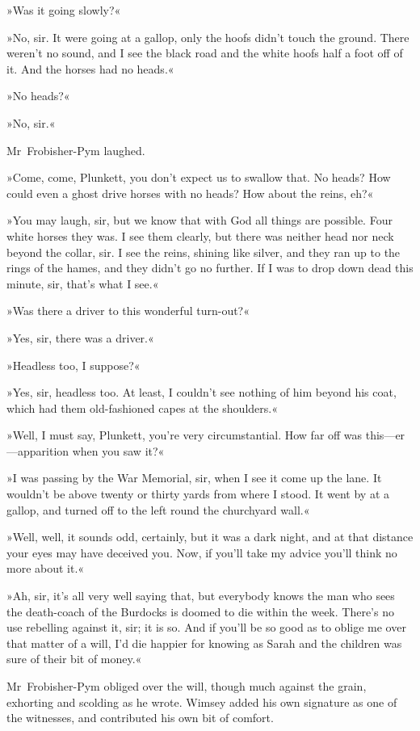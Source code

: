»Was it going slowly?«

»No, sir. It were going at a gallop, only the hoofs didn't touch the ground. There weren't no sound, and I see the black road and the white hoofs half a foot off of it. And the horses had no heads.«

»No heads?«

»No, sir.«

Mr~Frobisher-Pym laughed.

»Come, come, Plunkett, you don't expect us to swallow that. No heads? How could even a ghost drive horses with no heads? How about the reins, eh?«

»You may laugh, sir, but we know that with God all things are possible. Four white horses they was. I see them clearly, but there was neither head nor neck beyond the collar, sir. I see the reins, shining like silver, and they ran up to the rings of the hames, and they didn't go no further. If I was to drop down dead this minute, sir, that's what I see.«

»Was there a driver to this wonderful turn-out?«

»Yes, sir, there was a driver.«

»Headless too, I suppose?«

»Yes, sir, headless too. At least, I couldn't see nothing of him beyond his coat, which had them old-fashioned capes at the shoulders.«

»Well, I must say, Plunkett, you're very circumstantial. How far off was this—er—apparition when you saw it?«

»I was passing by the War Memorial, sir, when I see it come up the lane. It wouldn't be above twenty or thirty yards from where I stood. It went by at a gallop, and turned off to the left round the churchyard wall.«

»Well, well, it sounds odd, certainly, but it was a dark night, and at that distance your eyes may have deceived you. Now, if you'll take my advice you'll think no more about it.«

»Ah, sir, it's all very well saying that, but everybody knows the man who sees the death-coach of the Burdocks is doomed to die within the week. There's no use rebelling against it, sir; it is so. And if you'll be so good as to oblige me over that matter of a will, I'd die happier for knowing as Sarah and the children was sure of their bit of money.«

Mr~Frobisher-Pym obliged over the will, though much against the grain, exhorting and scolding as he wrote. Wimsey added his own signature as one of the witnesses, and contributed his own bit of comfort.

